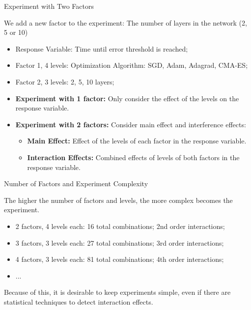 \begin{frame}{Experiment with Two Factors}
  \begin{block}{
    We add a new factor to the experiment: The number of layers
    in the network (2, 5 or 10)}
    \begin{itemize}
      \item Response Variable: Time until error threshold is reached;
      \item Factor 1, 4 levels: Optimization Algorithm: SGD, Adam, Adagrad, CMA-ES;
      \item Factor 2, 3 levels: 2, 5, 10 layers;
    \end{itemize}
  \end{block}

  \begin{itemize}
    \item {\bf Experiment with 1 factor:} Only consider the effect of the levels on the response variable.
    \item {\bf Experiment with 2 factors:} Consider main effect and interference effects:
    \begin{itemize}
      \item {\bf Main Effect:} Effect of the levels of each factor in the response variable.
      \item {\bf Interaction Effects:} Combined effects of levels of both factors in the response variable.
    \end{itemize}
  \end{itemize}

\end{frame}

\begin{frame}{Number of Factors and Experiment Complexity}

  The higher the number of factors and levels, the more complex becomes the experiment.
  \begin{itemize}
    \item 2 factors, 4 levels each: 16 total combinations; 2nd order interactions;
    \item 3 factors, 3 levels each: 27 total combinations; 3rd order interactions;
    \item 4 factors, 3 levels each: 81 total combinations; 4th order interactions;
    \item ...
  \end{itemize}\bigskip

  Because of this, it is desirable to keep experiments simple, even if there are statistical techniques to detect interaction effects.
\end{frame}

